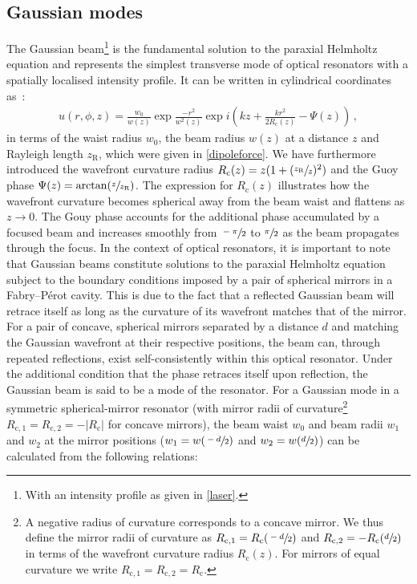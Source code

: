 \documentclass[../Thesis-IJspeert.tex]{subfiles}
\begin{document}
\subsection{Gaussian modes}
The Gaussian beam\footnote{With an intensity profile as given in \autoref{laser}.} is the fundamental solution to the paraxial Helmholtz equation and represents the simplest transverse mode of optical resonators with a spatially localised intensity profile. It can be written in cylindrical coordinates as~\cite{Saleh1991}:
\begin{align}
	\label{gaussianmode}
	u(r, \phi, z) = \frac{w_0}{w(z)}\exp{\frac{-r^2}{w^2(z)}}\exp{i\left( kz + \frac{kr^2}{2R_\mathrm{c}(z)} - \Psi(z)\right)}\,,
\end{align}
in terms of the waist radius $w_0$, the beam radius $w(z)$ at a distance $z$ and Rayleigh length $z_\mathrm{R}$, which were given in \autoref{dipoleforce}. We have furthermore introduced the wavefront curvature radius $R_\mathrm{c}(z)=z(1+(\sfrac{z_\mathrm{R}}{z})^2)$ and the Guoy phase $\Psi(z)=\arctan\left(\sfrac{z}{z_\mathrm{R}}\right)$. The expression for $R_\mathrm{c}(z)$ illustrates how the wavefront curvature becomes spherical away from the beam waist and flattens as $z \to 0$. The Gouy phase accounts for the additional phase accumulated by a focused beam and increases smoothly from $\sfrac{-\pi}{2}$ to $\sfrac{\pi}{2}$ as the beam propagates through the focus. In the context of optical resonators, it is important to note that Gaussian beams constitute solutions to the paraxial Helmholtz equation subject to the boundary conditions imposed by a pair of spherical mirrors in a Fabry--Pérot cavity. This is due to the fact that a reflected Gaussian beam will retrace itself as long as the curvature of its wavefront matches that of the mirror. For a pair of concave, spherical mirrors separated by a distance $d$ and matching the Gaussian wavefront at their respective positions, the beam can, through repeated reflections, exist self-consistently within this optical resonator. Under the additional condition that the phase retraces itself upon reflection, the Gaussian beam is said to be a mode of the resonator. For a Gaussian mode in a symmetric spherical-mirror resonator (with mirror radii of curvature\footnote{A negative radius of curvature corresponds to a concave mirror. We thus define the mirror radii of curvature as $R_{\mathrm{c},1}=R_\mathrm{c}(\sfrac{-d}{2})$ and $R_{\mathrm{c},2}=-R_\mathrm{c}(\sfrac{d}{2})$ in terms of the wavefront curvature radius $R_\mathrm{c}(z)$. For mirrors of equal curvature we write $R_{\mathrm{c},1}=R_{\mathrm{c},2}= R_\mathrm{c}$.} $R_{\mathrm{c},1}=R_{\mathrm{c},2}=-\lvert R_\mathrm{c} \rvert$ for concave mirrors), the beam waist $w_0$ and beam radii $w_1$ and $w_2$ at the mirror positions ($w_1=w(\sfrac{-d}{2})$ and $w_2=w(\sfrac{d}{2})$) can be calculated from the following relations:
\end{document}
